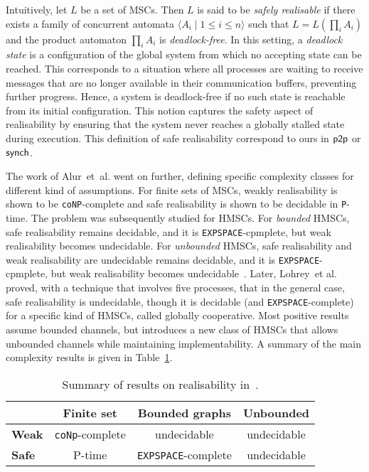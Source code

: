 Intuitively, let $L$ be a set of MSCs. Then $L$ is said to be 
\emph{safely realisable} if there exists a family of concurrent automata 
$\langle A_i \mid 1 \leq i \leq n \rangle$ such that $L = L(\prod_i A_i)$ 
and the product automaton $\prod_i A_i$ is \emph{deadlock-free}. 
In this setting, a \emph{deadlock state} is a configuration of the global 
system from which no accepting state can be reached. 
This corresponds to a situation where all processes are 
waiting to receive messages that are no longer available in their 
communication buffers, preventing further progress. 
Hence, a system is deadlock-free if no such state is reachable from its 
initial configuration. This notion captures the safety aspect of 
realisability by ensuring that the system never reaches a globally 
stalled state during execution. This definition of safe realisability 
correspond to ours in $\mathsf{p2p}$ or $\mathsf{synch}$.

The work of Alur~et~al. went on further, defining specific complexity classes 
for different kind of assumptions. For finite sets of MSCs,
weakly realisability is shown to be \verb|coNP|-complete and safe 
realisability is shown to be decidable in \verb|P|-time. The problem
was subsequently studied for HMSCs. For \emph{bounded} HMSCs, safe realisability 
remains decidable, and it is \verb|EXPSPACE|-cpmplete, but weak realisability 
becomes undecidable. For \emph{unbounded} HMSCs, 
safe realisability and weak realisability are undecidable
remains decidable, and it is \verb|EXPSPACE|-cpmplete, but weak realisability 
becomes undecidable~\cite{alur2005realizability}. 
Later, Lohrey~et al.~\cite{lohrey2003realizability} proved, with a technique
that involves five processes, that in the general case, safe realisability 
is undecidable, though it is decidable (and \verb|EXPSPACE|-complete) 
for a specific kind of HMSCs, called globally cooperative. %
Most positive results assume bounded channels, but \cite{bollig2025high} introduces 
a new class of HMSCs that allows unbounded channels while maintaining implementability.
A summary of the main complexity results is given in Table~\ref{tab:realisability}.

\bigskip

\begin{table}[!ht]
	\centering
	\begin{tabular}{|l|c|c|c|}
		\hline
		& \textbf{Finite set} & \textbf{Bounded graphs} & \textbf{Unbounded} \\
		\hline
		\textbf{Weak} & \verb|coNp|-complete & undecidable & undecidable \\
		\hline
		\textbf{Safe} & P-time & \verb|EXPSPACE|-complete & undecidable \\
		\hline
	\end{tabular}
	\caption{Summary of results on realisability in~\cite{alur2005realizability}.}
	\label{tab:realisability}
\end{table}


